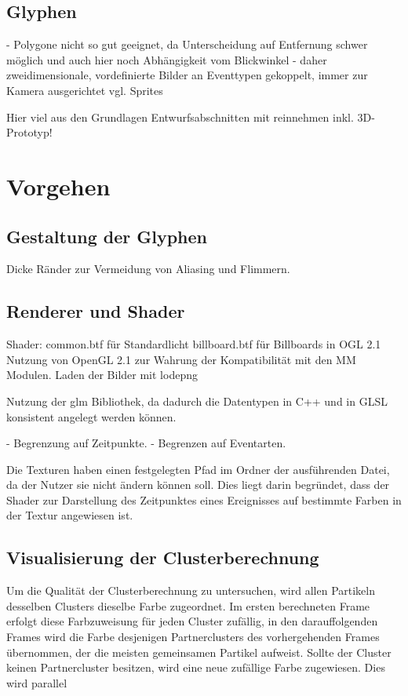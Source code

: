 \subsection{Glyphen}
- Polygone nicht so gut geeignet, da Unterscheidung auf Entfernung schwer möglich und auch hier noch Abhängigkeit vom Blickwinkel
- daher zweidimensionale, vordefinierte Bilder an Eventtypen gekoppelt, immer zur Kamera ausgerichtet vgl. Sprites

Hier viel aus den Grundlagen Entwurfsabschnitten mit reinnehmen inkl. 3D-Prototyp!

\section{Vorgehen}
\subsection{Gestaltung der Glyphen}

Dicke Ränder zur Vermeidung von Aliasing und Flimmern.

\subsection{Renderer und Shader}
Shader:
common.btf für Standardlicht
billboard.btf für Billboards in OGL 2.1
Nutzung von OpenGL 2.1 zur Wahrung der Kompatibilität mit den MM Modulen.
Laden der Bilder mit lodepng

Nutzung der glm Bibliothek, da dadurch die Datentypen in C++ und in GLSL konsistent angelegt werden können.

- Begrenzung auf Zeitpunkte.
- Begrenzen auf Eventarten.

Die Texturen haben einen festgelegten Pfad im Ordner der ausführenden Datei, da der Nutzer sie nicht ändern können soll. Dies liegt darin begründet, dass der Shader zur Darstellung des Zeitpunktes eines Ereignisses auf bestimmte Farben in der Textur angewiesen ist.


\subsection{Visualisierung der Clusterberechnung}

Um die Qualität der Clusterberechnung zu untersuchen, wird allen Partikeln desselben Clusters dieselbe Farbe zugeordnet. Im ersten berechneten Frame erfolgt diese Farbzuweisung für jeden Cluster zufällig, in den darauffolgenden Frames wird die Farbe desjenigen Partnerclusters des vorhergehenden Frames übernommen, der die meisten gemeinsamen Partikel aufweist. Sollte der Cluster keinen Partnercluster besitzen, wird eine neue zufällige Farbe zugewiesen. Dies wird parallel



